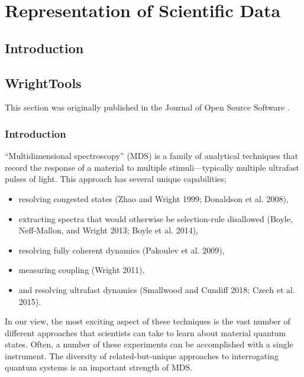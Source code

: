 \chapter{Representation of Scientific Data} \label{cha:rep}

\clearpage

\section{Introduction}  %

\clearpage

\section{WrightTools}  %

This section was originally published in the Journal of Open Source Software \cite{}.

\hypertarget{introduction}{%
\subsection{Introduction}\label{introduction}}

``Multidimensional spectroscopy'' (MDS) is a family of analytical
techniques that record the response of a material to multiple
stimuli---typically multiple ultrafast pulses of light. This approach
has several unique capabilities;

\begin{itemize}
\tightlist
\item
  resolving congested states (Zhao and Wright 1999; Donaldson et al.
  2008),
\item
  extracting spectra that would otherwise be selection-rule disallowed
  (Boyle, Neff-Mallon, and Wright 2013; Boyle et al. 2014),
\item
  resolving fully coherent dynamics (Pakoulev et al. 2009),
\item
  measuring coupling (Wright 2011),
\item
  and resolving ultrafast dynamics (Smallwood and Cundiff 2018; Czech et
  al. 2015).
\end{itemize}

In our view, the most exciting aspect of these techniques is the vast
number of different approaches that scientists can take to learn about
material quantum states. Often, a number of these experiments can be
accomplished with a single instrument. The diversity of
related-but-unique approaches to interrogating quantum systems is an
important strength of MDS.

